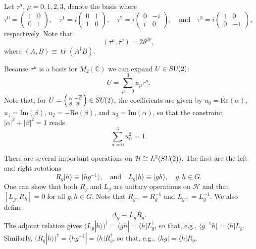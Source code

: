 \documentclass[12pt]{amsart}
\newcommand{\tr}{\operatorname{tr}}
\def\su2{\textsl{SU}(2)}
\theoremstyle{definition}
\theoremstyle{remark}
\numberwithin{equation}{section}
\begin{document}
Let $\tau^\mu$, $\mu= 0, 1, 2, 3$, denote the basis where
\begin{equation}
	\tau^0 =\begin{pmatrix}1 & 0 \\ 0 & 1\end{pmatrix}, \quad \tau^1 = {i}\begin{pmatrix} 0& 1\\ 1 & 0\end{pmatrix}, \quad \tau^2 = i\begin{pmatrix} 0& -i\\ i & 0\end{pmatrix}, \quad \text{and} \quad \tau^3 = {i}\begin{pmatrix} 1 & 0\\ 0 & -1\end{pmatrix},
\end{equation}
respectively. Note that
\begin{equation}
	(\tau^{\mu},\tau^{\nu}) = 2\delta^{\mu\nu}, 
\end{equation}
where $(A,B) \equiv \tr(A^\dag B)$.

Because $\tau^{\mu}$ is a basis for $M_2(\mathbb{C})$ we can expand $U\in \su2$:
\begin{equation}
	U = \sum_{\mu=0}^3 u_\mu \tau^\mu.
\end{equation}
Note that, for $U = \left(\begin{smallmatrix}\alpha & -\overline{\beta} \\ \beta & \overline{\alpha} \end{smallmatrix}\right) \in \su2$, the coefficients are given by $u_0 = \text{Re}(\alpha)$, $u_1 = \text{Im}(\beta)$, $u_2 = -\text{Re}(\beta)$, and $u_3 = \text{Im}(\alpha)$, so that the constraint $|\alpha|^2 + |\beta|^2 = 1$ reads
\begin{equation}
	\sum_{\alpha=0}^3 u_\alpha^2 = 1.
\end{equation}


There are several important operations on $\mathcal{H}\cong L^2(\su2)$. The first are the left and right rotations
\begin{equation}
	R_g|h\rangle \equiv |hg^{-1}\rangle, \quad \text{and}\quad L_g|h\rangle \equiv |gh\rangle, \quad g, h \in G.
\end{equation}
One can show that both $R_g$ and $L_g$ are unitary operations on $\mathcal{H}$ and that $[L_g, R_h] = 0$ for all $g,h\in G$. Note that $R_{g^{-1}} = R_{g}^{-1}$ and $L_{g^{-1}} = L_{g}^{-1}$. We also define 
\begin{equation}
	\Delta_{g} \equiv L_gR_g.
\end{equation}
The adjoint relation gives $(L_g|h\rangle)^\dag = \langle gh| = \langle h| L_g^\dag$, so that, e.g., $\langle g^{-1}h| = \langle h| L_g$. Similarly, $(R_g|h\rangle)^\dag = \langle hg^{-1}| = \langle h| R_g^\dag$, so that, e.g., $\langle hg| = \langle h| R_g$.
\end{document}
